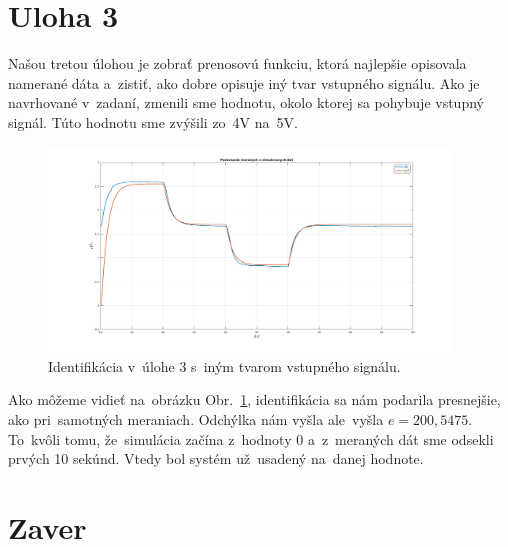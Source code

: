\documentclass{article}
\begin{document}
\section{Uloha 3}
\label{subsec:U3}

Našou tretou úlohou je zobrať prenosovú funkciu, ktorá najlepšie opisovala namerané dáta a~zistiť, ako dobre opisuje
iný tvar vstupného signálu. Ako je navrhované v~zadaní, zmenili sme hodnotu, okolo ktorej sa pohybuje vstupný signál.
Túto hodnotu sme zvýšili zo~4V na~5V.

\begin{figure}[!htbp]
	\begin{center}
		\includegraphics[width=0.95\textwidth]{include/uloha3.png}
	\end{center}
	\caption{Identifikácia v~úlohe 3 s~iným tvarom vstupného signálu.}
	\label{fig:u3}
\end{figure}

Ako môžeme vidieť na~obrázku Obr.~\ref{fig:u3}, identifikácia sa nám podarila presnejšie, ako pri~samotných meraniach.
Odchýlka nám vyšla ale~vyšla $e = 200,5475$. To~kvôli tomu, že~simulácia začína z~hodnoty 0 a~z~meraných dát sme odsekli
prvých 10 sekúnd. Vtedy bol systém už~usadený na~danej hodnote.

\section{Zaver}
\label{sec:zaver}
\end{document}
